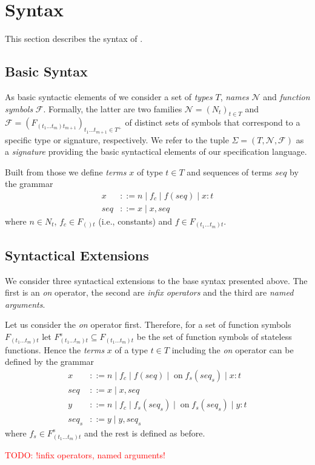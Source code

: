 \section{Syntax}

This section describes the syntax of \tessla.

\subsection{Basic Syntax}

As basic syntactic elements of \tessla we consider a set of \emph{types} $T$, \emph{names} $\mathcal{N}$ and \emph{function symbols} $\mathcal{F}$.
Formally, the latter are two families $\mathcal{N}=(N_t)_{t \in T}$ and $\mathcal{F}=(F_{(t_1…t_m)t_{m+1}})_{t_1…t_{m+1} \in T^+}$ of distinct sets of symbols that correspond to a specific type or signature, respectively.
We refer to the tuple $Σ=(T,\mathcal{N}, \mathcal{F})$ as a \emph{signature} providing the basic syntactical elements of our specification language.

Built from those we define \emph{terms} $x$ of type $t \in T$ and sequences of terms $seq$ by the grammar
\[\begin{array}{rl}
x &::= n \mid f_c \mid f(seq) \mid x : t\\
seq &::= x \mid x,seq
\end{array}\]
where $n \in N_t$, $f_c \in F_{()t}$ (i.e., constants) and $f \in F_{(t_1…t_m)t}$.

\subsection{Syntactical Extensions}

We consider three syntactical extensions to the base syntax presented above. The first is an \emph{on} operator, the second are \emph{infix operators} and the third are \emph{named arguments}.

Let us consider the \emph{on} operator first. Therefore, for a set of function symbols $F_{(t_1…t_m)t}$ let $F^s_{(t_1…t_m)t} \subseteq F_{(t_1…t_m)t}$ be the set of function symbols of stateless functions. Hence the \emph{terms} $x$ of a type $t \in T$ including the \emph{on} operator can be defined by the grammar
\[\begin{array}{rl}
x &::= n \mid f_c \mid f(seq) \mid \operatorname{on} f_s(seq_s) \mid x : t\\
seq &::= x \mid x,seq \\
y &::= n \mid f_c \mid f_s(seq_s) \mid \operatorname{on} f_s(seq_s) \mid y : t \\
seq_s &::= y \mid y,seq_s
\end{array}\]
where $f_s \in F^s_{(t_1…t_m)t}$ and the rest is defined as before.

\textcolor{red}{TODO: !infix operators, named arguments!}
